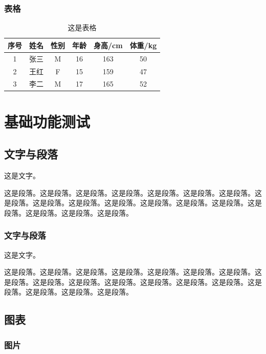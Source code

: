\begin{ujnbody}
    \subsubsection{表格}

    \begin{table}[!htbp]
        \centering
        \begin{tabular}{cccccc}
            \toprule
            序号 & 姓名 & 性别 & 年龄 & 身高/cm & 体重/kg \\
            \midrule
            1 & 张三 & M & 16 & 163 & 50 \\
            2 & 王红 & F & 15 & 159 & 47 \\
            3 & 李二 & M & 17 & 165 & 52 \\
            \bottomrule
        \end{tabular}
        \caption{这是表格}
    \end{table}

    \section{基础功能测试}
    \subsection{文字与段落}
    这是文字。

    这是段落。这是段落。这是段落。这是段落。这是段落。这是段落。这是段落。这是段落。这是段落。这是段落。这是段落。这是段落。这是段落。这是段落。这是段落。这是段落。这是段落。这是段落。
    \subsubsection{文字与段落}
    这是文字。

    这是段落。这是段落。这是段落。这是段落。这是段落。这是段落。这是段落。这是段落。这是段落。这是段落。这是段落。这是段落。这是段落。这是段落。这是段落。这是段落。这是段落。这是段落。
    \subsection{图表}

    \subsubsection{图片}


\end{ujnbody}
